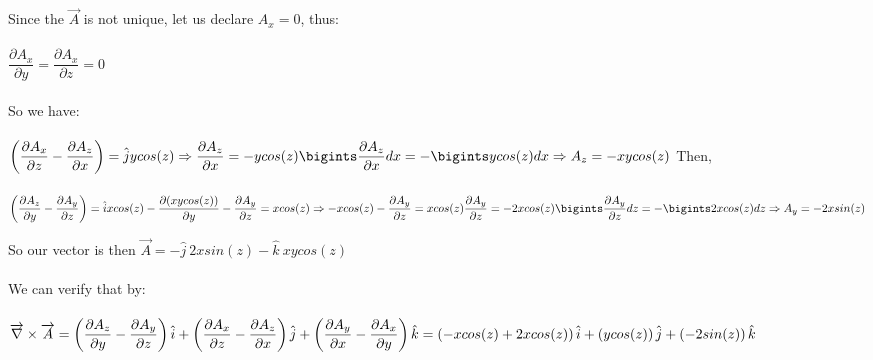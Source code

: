 \documentclass[fleqn]{article}
\begin{document}
\begin{enumerate}
      \textcolor{hwColor}{
        Since the $\overrightarrow{A}$ is not unique, let us declare $A_x=0$, thus: \\
        \\
        $\dfrac{\partial A_x}{\partial y}=\dfrac{\partial A_x}{\partial z}=0$ \\ \\
        So we have: \\ \\
        $
          \left(\dfrac{\partial A_x}{\partial z}-\dfrac{\partial A_z}{\partial x}\right)=\hat{j}y cos(z) \Rightarrow \dfrac{\partial A_z}{\partial x}=-ycos(z) \\ \\
          \\
          \bigints \dfrac{\partial A_z}{\partial x} dx=-\bigints y cos(z)dx \Rightarrow A_z=-xy cos(z) \\ \\
        $
        Then, \\ \\
        $
          \left(\dfrac{\partial A_z}{\partial y}-\dfrac{\partial A_y}{\partial z}\right)=\hat{i}x cos(z) \\
          \\
          \\
          -\dfrac{\partial (xy cos(z))}{\partial y}-\dfrac{\partial A_y}{\partial z}=x cos(z) \Rightarrow -x cos(z)-\dfrac{\partial A_y}{\partial z}=x cos(z) \\
          \\
          \dfrac{\partial A_y}{\partial z}=-2x cos(z) \\ \\
          \bigints \dfrac{\partial A_y}{\partial z} dz=-\bigints 2x cos(z)dz \Rightarrow A_y=-2xsin(z) \\ \\
        $
      }

      \textcolor{hwColor}{
        So our vector is then $\overrightarrow{A}=-\hat{j} ~ 2xsin(z)-\hat{k} ~ xy cos(z)$ \\
        \\
        We can verify that by: \\
        \\
        $
          \overrightarrow{\nabla} \times \overrightarrow{A}=\left(\dfrac{\partial A_z}{\partial y}-\dfrac{\partial A_y}{\partial z}\right) \hat{i}+\left(\dfrac{\partial A_x}{\partial z}-\dfrac{\partial A_z}{\partial x}\right) \hat{j}+\left(\dfrac{\partial A_y}{\partial x}-\dfrac{\partial A_x}{\partial y}\right) \hat{k} \\
          \\
          \\
          =\left(-x cos(z)+2x cos(z)\right)\hat{i}+\left(y cos(z)\right) \hat{j}+\left(-2 sin(z)\right) \hat{k}
        $
      }
    
  \end{enumerate}
\end{document}

